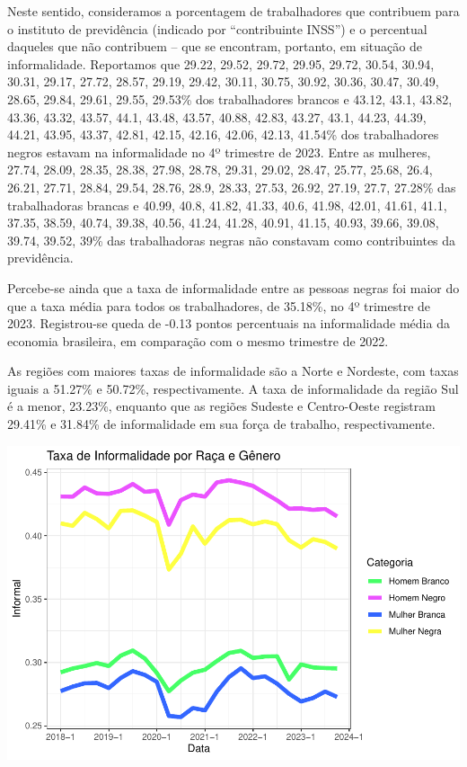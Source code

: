 \documentclass[
]{article}
\begin{document}
Neste sentido, consideramos a porcentagem de trabalhadores que
contribuem para o instituto de previdência (indicado por ``contribuinte
INSS'') e o percentual daqueles que não contribuem -- que se encontram,
portanto, em situação de informalidade. Reportamos que 29.22, 29.52,
29.72, 29.95, 29.72, 30.54, 30.94, 30.31, 29.17, 27.72, 28.57, 29.19,
29.42, 30.11, 30.75, 30.92, 30.36, 30.47, 30.49, 28.65, 29.84, 29.61,
29.55, 29.53\% dos trabalhadores brancos e 43.12, 43.1, 43.82, 43.36,
43.32, 43.57, 44.1, 43.48, 43.57, 40.88, 42.83, 43.27, 43.1, 44.23,
44.39, 44.21, 43.95, 43.37, 42.81, 42.15, 42.16, 42.06, 42.13, 41.54\%
dos trabalhadores negros estavam na informalidade no 4º trimestre de
2023. Entre as mulheres, 27.74, 28.09, 28.35, 28.38, 27.98, 28.78,
29.31, 29.02, 28.47, 25.77, 25.68, 26.4, 26.21, 27.71, 28.84, 29.54,
28.76, 28.9, 28.33, 27.53, 26.92, 27.19, 27.7, 27.28\% das trabalhadoras
brancas e 40.99, 40.8, 41.82, 41.33, 40.6, 41.98, 42.01, 41.61, 41.1,
37.35, 38.59, 40.74, 39.38, 40.56, 41.24, 41.28, 40.91, 41.15, 40.93,
39.66, 39.08, 39.74, 39.52, 39\% das trabalhadoras negras não constavam
como contribuintes da previdência.

Percebe-se ainda que a taxa de informalidade entre as pessoas negras foi
maior do que a taxa média para todos os trabalhadores, de 35.18\%, no 4º
trimestre de 2023. Registrou-se queda de -0.13 pontos percentuais na
informalidade média da economia brasileira, em comparação com o mesmo
trimestre de 2022.

As regiões com maiores taxas de informalidade são a Norte e Nordeste,
com taxas iguais a 51.27\% e 50.72\%, respectivamente. A taxa de
informalidade da região Sul é a menor, 23.23\%, enquanto que as regiões
Sudeste e Centro-Oeste registram 29.41\% e 31.84\% de informalidade em
sua força de trabalho, respectivamente.

\includegraphics{R-Markdown--Long-Version-_files/figure-latex/unnamed-chunk-15-1.pdf}
\end{document}
